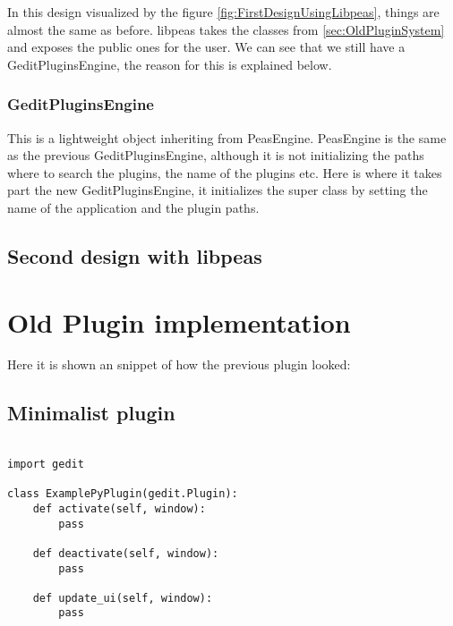 
In this design visualized by the figure \ref{fig:FirstDesignUsingLibpeas}, things are almost the same as before. libpeas takes the classes from \ref{sec:OldPluginSystem} and exposes the public ones for the user. We can see that we still have a GeditPluginsEngine, the reason for this is explained below.

\subsubsection{GeditPluginsEngine}

This is a lightweight object inheriting from PeasEngine. PeasEngine is the same as the previous GeditPluginsEngine, although it is not initializing the paths where to search the plugins, the name of the plugins etc. Here is where it takes part the new GeditPluginsEngine, it initializes the super class by setting the name of the application and the plugin paths.

\subsection{Second design with libpeas}


\newpage
\section{Old Plugin implementation}

Here it is shown an snippet of how the previous plugin looked:

\subsection{Minimalist plugin}

\begin{lstlisting}[style=python]

import gedit

class ExamplePyPlugin(gedit.Plugin):
    def activate(self, window):
        pass

    def deactivate(self, window):
        pass

    def update_ui(self, window):
        pass

\end{lstlisting}

